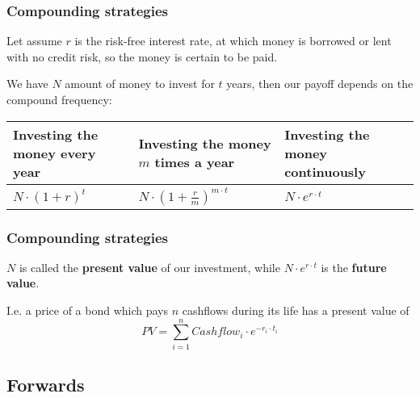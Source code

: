 \documentclass[ignorenonframetext, 9pt]{beamer}
\begin{document}
\begin{frame}
\frametitle{Compounding strategies}

Let assume $r$ is the risk-free interest rate, at which money is borrowed or lent with no credit risk, so the money is certain to be paid. \newline

\pause

We have $N$ amount of money to invest for $t$ years, then our payoff depends on the compound frequency: \newline

{
\footnotesize
\begin{tabular}{ >{\centering\arraybackslash}p{} | >{\centering\arraybackslash}p{} | >{\centering\arraybackslash}p{} }
Investing the money every year & Investing the money $m$ times a year & Investing the money continuously \\ \hline
\(\displaystyle N \cdot (1 + r)^t \) & \(\displaystyle N \cdot \left( 1 + \frac{r}{m}\right) ^{m \cdot t} \)
& \(\displaystyle N \cdot e^{r\cdot t} \) \\
\end{tabular}
}

\end{frame}

\begin{frame}
\frametitle{Compounding strategies}

$N$ is called the \textbf{present value} of our investment, while $N \cdot e^{r\cdot t}$ is the \textbf{future value}. \newline

I.e. a price of a bond which pays $n$ cashflows during its life has a present value of
\begin{equation}
            PV = \sum_{i=1}^n Cashflow_i \cdot e^{-r_i \cdot t_i}
\end{equation}

\end{frame}


\subsection{Forwards}
\end{document}
